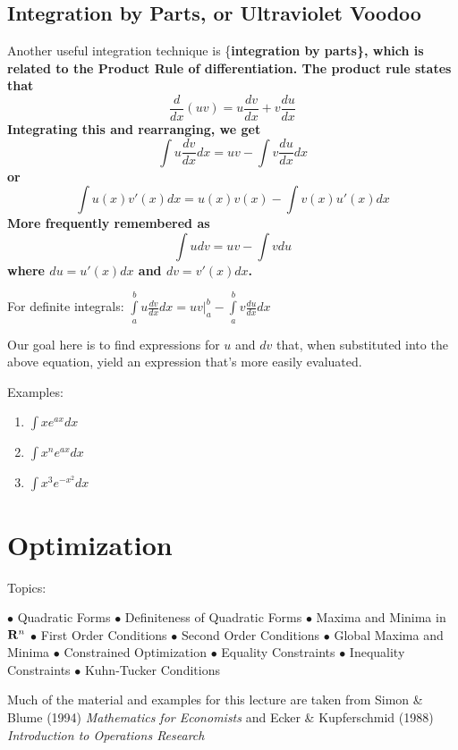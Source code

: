 \documentclass[]{book}
\theoremstyle{definition}
\theoremstyle{definition}
\theoremstyle{definition}
\theoremstyle{remark}
\begin{document}
\section{Integration by Parts, or Ultraviolet
Voodoo}\label{integration-by-parts-or-ultraviolet-voodoo}

Another useful integration technique is \{\bf integration by parts\},
which is related to the Product Rule of differentiation. The product
rule states that \[\frac{d}{dx}(uv)=u\frac{dv}{dx}+v\frac{du}{dx}\]
Integrating this and rearranging, we get
\[\int u\frac{dv}{dx}dx= u v - \int v \frac{du}{dx}dx\] or
\[\int u(x) v'(x)dx=u(x)v(x) - \int v(x)u'(x)dx\] More frequently
remembered as \[\int u dv = u v - \int v du\] where \(du=u'(x)dx\) and
\(dv=v'(x)dx\).

For definite integrals:
\(\int\limits_a^b u\frac{dv}{dx}dx = \left. u v \right|_a^b - \int\limits_a^b v \frac{du}{dx}dx\)

Our goal here is to find expressions for \(u\) and \(dv\) that, when
substituted into the above equation, yield an expression that's more
easily evaluated.

Examples:

\begin{framed}
\begin{enumerate}
        \item $\int x e^{ax} dx$
        \item $\int x^n e^{ax} dx$\\
        \item $\int x^3 e^{-x^2} dx$\\
\vspace{10pt}
\end{enumerate}
\end{framed}

\chapter{Optimization}\label{optimization}

Topics:

\(\bullet\) Quadratic Forms \(\bullet\) Definiteness of Quadratic Forms
\(\bullet\) Maxima and Minima in \({\bf R}^n\) \(\bullet\) First Order
Conditions \(\bullet\) Second Order Conditions \(\bullet\) Global Maxima
and Minima \(\bullet\) Constrained Optimization \(\bullet\) Equality
Constraints \(\bullet\) Inequality Constraints \(\bullet\) Kuhn-Tucker
Conditions

Much of the material and examples for this lecture are taken from Simon
\& Blume (1994) \emph{Mathematics for
Economists} and Ecker \& Kupferschmid (1988) \emph{Introduction to
Operations Research}
\end{document}
